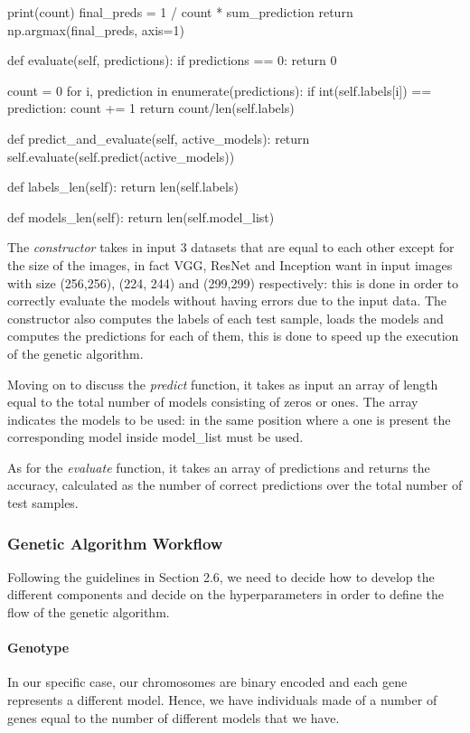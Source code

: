 \begin{python}
        print(count)
        final_preds = 1 / count * sum_prediction
        return np.argmax(final_preds, axis=1)

    def evaluate(self, predictions):
        if predictions == 0:
            return 0

        count = 0
        for i, prediction in enumerate(predictions):
            if int(self.labels[i]) == prediction:
                count += 1
        return count/len(self.labels)

    def predict_and_evaluate(self, active_models):
        return self.evaluate(self.predict(active_models))

    def labels_len(self):
        return len(self.labels)
        
    def models_len(self):
        return len(self.model_list)
\end{python}

The \textit{constructor} takes in input 3 datasets that are equal to each other except for the size of the images, in fact VGG, ResNet and Inception want in input images with size (256,256), (224, 244) and (299,299) respectively: this is done in order to correctly evaluate the models without having errors due to the input data. The constructor also computes the labels of each test sample, loads the models and computes the predictions for each of them, this is done to speed up the execution of the genetic algorithm.

Moving on to discuss the \textit{predict} function, it takes as input an array of length equal to the total number of models consisting of zeros or ones. The array indicates the models to be used: in the same position where a one is present the corresponding model inside {model\_list} must be used.

As for the \textit{evaluate} function, it takes an array of predictions and returns the accuracy, calculated as the number of correct predictions over the total number of test samples.

\subsubsection{Genetic Algorithm Workflow}
Following the guidelines in Section 2.6, we need to decide how to develop the different components and decide on the hyperparameters in order to define the flow of the genetic algorithm.

\paragraph{Genotype}
In our specific case, our chromosomes are binary encoded and each gene represents a different model. Hence, we have individuals made of a number of genes equal to the number of different models that we have.

